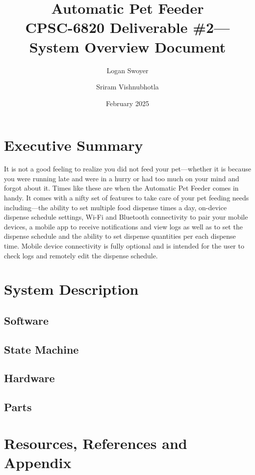 \documentclass{article}
\title{Automatic Pet Feeder\\
\large CPSC-6820 Deliverable \#2---System Overview Document}
\author{Logan Swoyer \and Sriram Vishnubhotla}
\date{February 2025}
\begin{document}
\maketitle

\section{Executive Summary}
It is not a good feeling to realize you did not feed your pet---whether it is because you were running late and were in a hurry or had too much on your mind and forgot about it. Times like these are when the Automatic Pet Feeder comes in handy. It comes with a nifty set of features to take care of your pet feeding needs including---the ability to set multiple food dispense times a day, on-device dispense schedule settings, Wi-Fi and Bluetooth connectivity to pair your mobile devices, a mobile app to receive notifications and view logs as well as to set the dispense schedule and the ability to set dispense quantities per each dispense time. Mobile device connectivity is fully optional and is intended for the user to check logs and remotely edit the dispense schedule.

\section{System Description}
\subsection{Software}
\subsection{State Machine}
\subsection{Hardware}
\subsection{Parts}
\section{Resources, References and Appendix}
\end{document}
